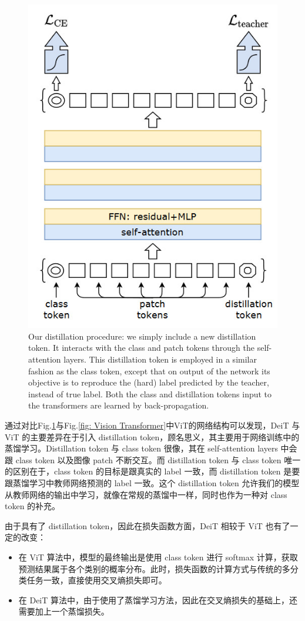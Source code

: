\documentclass[letterpaper,10pt]{article}
\begin{document}
	\begin{figure}[htbp]
		\centering 
		\includegraphics[width=0.5
		\columnwidth]{picture/DeiT-network-structure}
		\caption{
			\label{fig: DeiT-network-structure} Our distillation procedure: we simply include a new distillation token. It interacts with the class and patch tokens through the self-attention layers. This distillation token is employed in a similar fashion as the class token, except that on output of the network its objective is to reproduce the (hard) label predicted by the teacher, instead of true label. Both the class and distillation tokens input to the transformers are learned by back-propagation.
		}
	\end{figure}
	
	通过对比Fig.\ref{fig: DeiT-network-structure}与Fig.\ref{fig: Vision Transformer}中ViT的网络结构可以发现，DeiT 与 ViT 的主要差异在于引入 distillation token，顾名思义，其主要用于网络训练中的蒸馏学习。Distillation token 与 class token 很像，其在 self-attention layers 中会跟 class token 以及图像 patch 不断交互。而 distillation token 与 class token 唯一的区别在于，class token 的目标是跟真实的 label 一致，而 distillation token 是要跟蒸馏学习中教师网络预测的 label 一致。这个 distillation token 允许我们的模型从教师网络的输出中学习，就像在常规的蒸馏中一样，同时也作为一种对 class token 的补充。
	
	由于具有了 distillation token，因此在损失函数方面，DeiT 相较于 ViT 也有了一定的改变：
	
	\begin{itemize}
		\item{}
			在 ViT 算法中，模型的最终输出是使用 class token 进行 softmax 计算，获取预测结果属于各个类别的概率分布。此时，损失函数的计算方式与传统的多分类任务一致，直接使用交叉熵损失即可。
		\item{}
			在 DeiT 算法中，由于使用了蒸馏学习方法，因此在交叉熵损失的基础上，还需要加上一个蒸馏损失。
	\end{itemize}
	
\end{document}
